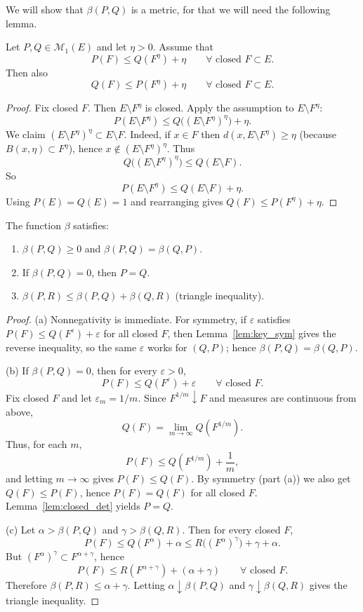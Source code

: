 We will show that $\beta(P,Q)$ is a metric, for that we will need the following lemma.
\begin{lemma}
\label{lem:key_sym}
Let $P,Q\in\mathcal{M}_1(E)$ and let $\eta>0$. Assume that
\[
P(F)\le Q(F^\eta)+\eta\qquad\forall\text{ closed }F\subset E.
\]
Then also
\[
Q(F)\le P(F^\eta)+\eta\qquad\forall\text{ closed }F\subset E.
\]
\end{lemma}

\begin{proof}
Fix closed $F$. Then $E\setminus F^\eta$ is closed. Apply the assumption to $E\setminus F^\eta$:
\[
P(E\setminus F^\eta)\le Q\big((E\setminus F^\eta)^\eta\big)+\eta.
\]
We claim $(E\setminus F^\eta)^\eta\subset E\setminus F$. Indeed, if $x\in F$ then $d(x,E\setminus F^\eta)\ge \eta$
(because $B(x,\eta)\subset F^\eta$), hence $x\notin (E\setminus F^\eta)^\eta$. Thus
\[
Q\big((E\setminus F^\eta)^\eta\big)\le Q(E\setminus F).
\]
So
\[
P(E\setminus F^\eta)\le Q(E\setminus F)+\eta.
\]
Using $P(E)=Q(E)=1$ and rearranging gives $Q(F)\le P(F^\eta)+\eta$.
\end{proof}

\begin{proposition}
\label{prop:beta_metric}
The function $\beta$ satisfies:
\begin{enumerate}[label=(\alph*)]
\item $\beta(P,Q)\ge 0$ and $\beta(P,Q)=\beta(Q,P)$.
\item If $\beta(P,Q)=0$, then $P=Q$.
\item $\beta(P,R)\le \beta(P,Q)+\beta(Q,R)$ (triangle inequality).
\end{enumerate}
\end{proposition}

\begin{proof}
(a) Nonnegativity is immediate. For symmetry, if $\varepsilon$ satisfies
$P(F)\le Q(F^\varepsilon)+\varepsilon$ for all closed $F$, then Lemma~\ref{lem:key_sym} gives the reverse inequality,
so the same $\varepsilon$ works for $(Q,P)$; hence $\beta(P,Q)=\beta(Q,P)$.

(b) If $\beta(P,Q)=0$, then for every $\varepsilon>0$,
\[
P(F)\le Q(F^\varepsilon)+\varepsilon\qquad\forall\text{ closed }F.
\]
Fix closed $F$ and let $\varepsilon_m=1/m$. Since $F^{1/m}\downarrow F$ and measures are continuous from above,
\[
Q(F)=\lim_{m\to\infty} Q(F^{1/m}).
\]
Thus, for each $m$,
\[
P(F)\le Q(F^{1/m})+\frac1m,
\]
and letting $m\to\infty$ gives $P(F)\le Q(F)$. By symmetry (part (a)) we also get $Q(F)\le P(F)$, hence $P(F)=Q(F)$
for all closed $F$. Lemma~\ref{lem:closed_det} yields $P=Q$.

(c) Let $\alpha>\beta(P,Q)$ and $\gamma>\beta(Q,R)$. Then for every closed $F$,
\[
P(F)\le Q(F^\alpha)+\alpha \le R\big((F^\alpha)^\gamma\big)+\gamma+\alpha.
\]
But $(F^\alpha)^\gamma\subset F^{\alpha+\gamma}$, hence
\[
P(F)\le R(F^{\alpha+\gamma})+(\alpha+\gamma)\qquad\forall\text{ closed }F.
\]
Therefore $\beta(P,R)\le \alpha+\gamma$. Letting $\alpha\downarrow\beta(P,Q)$ and $\gamma\downarrow\beta(Q,R)$ gives the triangle inequality.
\end{proof}

